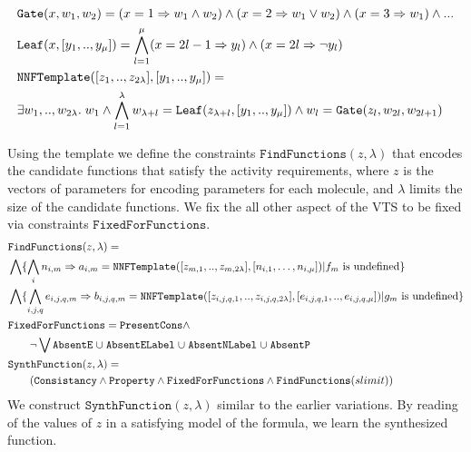 
\begin{align*}
  &\texttt{Gate}( x, w_1, w_2 ) = ( x  = 1 \Rightarrow w_1  \land w_2 ) \land  
  ( x = 2  \Rightarrow w_1  \lor w_2 ) \land
  ( x = 3  \Rightarrow w_1 ) \land ...\\
  &\texttt{Leaf}( x, [y_1,..,y_\mu] ) =
  \bigwedge\limits_{l=1}^{\mu} ( x = 2l-1  \Rightarrow y_{l}) \land ( x = 2l  \Rightarrow \lnot y_{l})\\
  &\texttt{NNFTemplate}([z_1,..,z_{2\lambda}],[y_1,..,y_\mu] ) = \\
  &\exists w_1,..,w_{2\lambda}.\;w_1 \land \bigwedge_{l=1}^{\lambda} w_{\lambda+l} = \texttt{Leaf}( z_{\lambda+l}, [y_1,..,y_\mu] ) \land
  w_{l} = \texttt{Gate}( z_l, w_{2l},w_{2l+1})
\end{align*}

Using the template we define the constraints $\texttt{FindFunctions}(z,\lambda)$
that encodes the candidate functions that satisfy the activity requirements,
where $z$ is the vectors of parameters for encoding parameters
for each molecule,
and $\lambda$ limits the size of the candidate functions. 
%
We fix the all other aspect of the VTS to be fixed via constraints
$\texttt{FixedForFunctions}$.
%
\begin{align*}
  &\texttt{FindFunctions}(z,\lambda) =\\
  &\bigwedge \{ \bigwedge\limits_{i} n_{i,m} \Rightarrow a_{i,m} = 
  \texttt{NNFTemplate}([z_{m,1},..,z_{m,2\lambda}],[n_{i,1},\dots,n_{i,\mu}] ) |
  f_m \text{ is undefined}\} \\
  &\bigwedge \{ \bigwedge\limits_{i,j,q} e_{i,j,q,m} \Rightarrow b_{i,j,q,m} = 
  \texttt{NNFTemplate}([z_{i,j,q,1},..,z_{i,j,q,2\lambda}],[e_{i,j,q,1},..,e_{i,j,q,\mu}] ) | 
  g_m \text{ is undefined}
  \}\\
  & \texttt{FixedForFunctions} = \texttt{PresentCons} \land\\
  & \quad \quad
\lnot \bigvee \texttt{AbsentE} \;{\cup}\; \texttt{AbsentELabel} \;{\cup}\;
                    \texttt{AbsentNLabel} \;{\cup}\;
                    \texttt{AbsentP}\\
  &\texttt{SynthFunction}(z,\lambda) = \\
  & \quad\quad
    (  \texttt{Consistancy}\land \texttt{Property} \land
   \texttt{FixedForFunctions} \land \texttt{FindFunctions}(slimit) )
\end{align*}
We construct $\texttt{SynthFunction}(z,\lambda)$ similar to the earlier
variations.
%
By reading of the values of $z$ in a satisfying model of the formula,
we learn the synthesized function.

